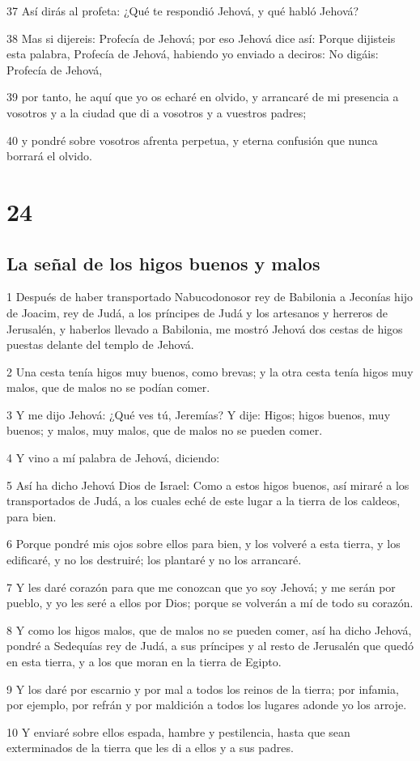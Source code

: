 \par 37 Así dirás al profeta: ¿Qué te respondió Jehová, y qué habló Jehová?
\par 38 Mas si dijereis: Profecía de Jehová; por eso Jehová dice así: Porque dijisteis esta palabra, Profecía de Jehová, habiendo yo enviado a deciros: No digáis: Profecía de Jehová,
\par 39 por tanto, he aquí que yo os echaré en olvido, y arrancaré de mi presencia a vosotros y a la ciudad que di a vosotros y a vuestros padres;
\par 40 y pondré sobre vosotros afrenta perpetua, y eterna confusión que nunca borrará el olvido.

\chapter{24}

\section*{La señal de los higos buenos y malos}

\par 1 Después de haber transportado Nabucodonosor rey de Babilonia a Jeconías hijo de Joacim, rey de Judá, a los príncipes de Judá y los artesanos y herreros de Jerusalén, y haberlos llevado a Babilonia, me mostró Jehová dos cestas de higos puestas delante del templo de Jehová.
\par 2 Una cesta tenía higos muy buenos, como brevas; y la otra cesta tenía higos muy malos, que de malos no se podían comer.
\par 3 Y me dijo Jehová: ¿Qué ves tú, Jeremías? Y dije: Higos; higos buenos, muy buenos; y malos, muy malos, que de malos no se pueden comer.
\par 4 Y vino a mí palabra de Jehová, diciendo:
\par 5 Así ha dicho Jehová Dios de Israel: Como a estos higos buenos, así miraré a los transportados de Judá, a los cuales eché de este lugar a la tierra de los caldeos, para bien.
\par 6 Porque pondré mis ojos sobre ellos para bien, y los volveré a esta tierra, y los edificaré, y no los destruiré; los plantaré y no los arrancaré.
\par 7 Y les daré corazón para que me conozcan que yo soy Jehová; y me serán por pueblo, y yo les seré a ellos por Dios; porque se volverán a mí de todo su corazón.
\par 8 Y como los higos malos, que de malos no se pueden comer, así ha dicho Jehová, pondré a Sedequías rey de Judá, a sus príncipes y al resto de Jerusalén que quedó en esta tierra, y a los que moran en la tierra de Egipto.
\par 9 Y los daré por escarnio y por mal a todos los reinos de la tierra; por infamia, por ejemplo, por refrán y por maldición a todos los lugares adonde yo los arroje. 
\par 10 Y enviaré sobre ellos espada, hambre y pestilencia, hasta que sean exterminados de la tierra que les di a ellos y a sus padres.

